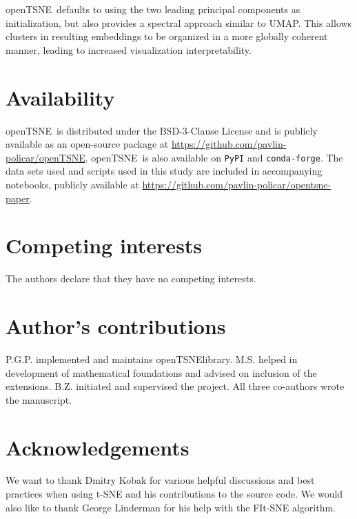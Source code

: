 \documentclass[twocolumn]{bmcart}
\newcommand{\opentsne}{\textsf{openTSNE}}
\begin{document}
\opentsne\ defaults to using the two leading principal components as
initialization, but also provides a spectral approach similar to UMAP.
This allows clusters in resulting embeddings to be organized in a more globally coherent
manner, leading to increased visualization interpretability.

\section*{Availability}

\opentsne\ is distributed under the BSD-3-Clause License and is publicly
available as an open-source package at
\url{https://github.com/pavlin-policar/openTSNE}. \opentsne\ is also available on
\texttt{PyPI} and \texttt{conda-forge}. The data sets used and scripts used in this study are
included in accompanying notebooks, publicly available at
\url{https://github.com/pavlin-policar/opentsne-paper}.

\begin{backmatter}

\section*{Competing interests}
The authors declare that they have no competing interests.

\section*{Author's contributions}
P.G.P. implemented and maintains \opentsne library. M.S. helped in development of mathematical foundations and advised on inclusion of the extensions. B.Z. initiated and supervised the project. All three co-authors wrote the manuscript.

\section*{Acknowledgements}
We want to thank Dmitry Kobak for various helpful discussions and best practices when using t-SNE and his contributions to the source code. We would also like to thank George Linderman for his help with the FIt-SNE algorithm.


\end{backmatter}
\end{document}
